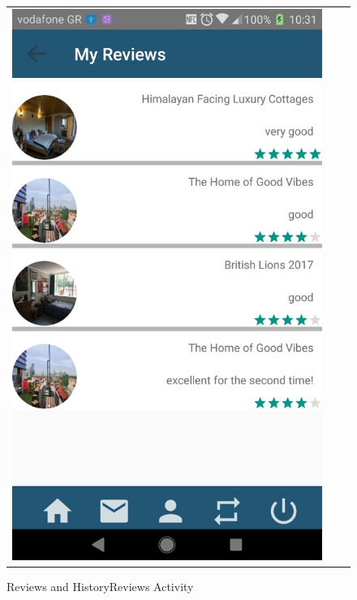 \documentclass[12pt]{article}
\begin{document}
\begin{center}
\begin{figure}
\begin{tabular}{c c c}
				\includegraphics[scale=0.16, keepaspectratio]{16-historyreviews.jpg}
				\\
			\end{tabular}
			\caption{Reviews and HistoryReviews Activity}
		\end{figure}
	\end{center}
	
\end{document}

